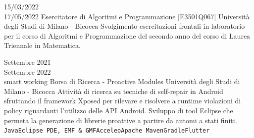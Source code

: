 \documentclass[9pt]{developercv}
\begin{document}
\begin{entrylist}
	\entry
	{15/03/2022 \\ 17/05/2022}
	{Esercitatore di Algoritmi e Programmazione [E3501Q067]}
	{Università degli Studi di Milano - Bicocca}
	{Svolgimento esercitazioni frontali in laboratorio per il corso di Algoritmi e Programmazione del secondo anno del corso di Laurea Triennale in Matematica.}

	\entry
	{Settembre 2021 \\ Settembre 2022	\\\footnotesize{smart working}}
	{Borsa di Ricerca - Proactive Modules}
	{Università degli Studi di Milano - Bicocca}
	{Attività di ricerca su tecniche di self-repair in Android sfruttando il framework Xposed per rilevare e risolvere a runtime violazioni di policy riguardanti l'utilizzo delle API Android. Sviluppo di tool Eclipse che permeta la generazione di librerie proattive a partire da automi a stati finiti. \\ \texttt{Java}\slashsep\texttt{Eclipse PDE, EMF \& GMF}\slashsep\texttt{Acceleo}\slashsep\texttt{Apache Maven}\slashsep\texttt{Gradle}\slashsep\texttt{Flutter}}
	

\end{entrylist}
\end{document}
